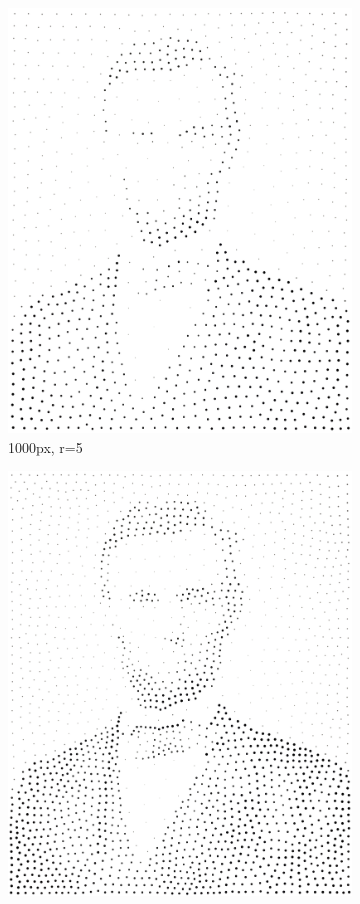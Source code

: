 \documentclass[11pt]{article}
\begin{document}
\begin{figure}[H]
\begin{subfigure}[b]{0.2\linewidth}
		\includegraphics[width=\linewidth]{pix/hc_AL_1000_r5.png}
		\caption{1000px, r=5}
	\end{subfigure}
	\begin{subfigure}[b]{0.2\linewidth}
		\includegraphics[width=\linewidth]{pix/hc_AL_2000_r5.png}

\end{subfigure}
\end{figure}
\end{document}

